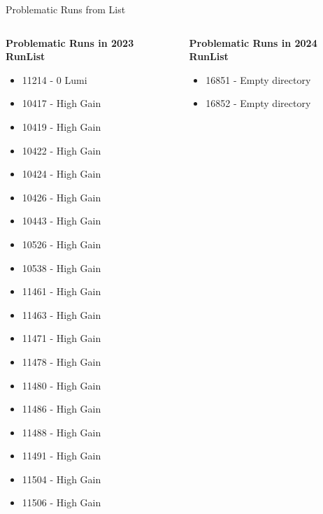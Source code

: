 \begin{frame}{Problematic Runs from List}
    \begin{columns}
        \begin{column}{0.5 \linewidth}
            \scriptsize \textbf{Problematic Runs in 2023 RunList}
            \begin{itemize}
                \setlength\itemsep{-0.1em}
                \scriptsize
                \item 11214 - 0 Lumi
                \item 10417 - High Gain
                \item 10419 - High Gain
                \item 10422 - High Gain
                \item 10424 - High Gain
                \item 10426 - High Gain
                \item 10443 - High Gain
                \item 10526 - High Gain
                \item 10538 - High Gain
                \item 11461 - High Gain
                \item 11463 - High Gain
                \item 11471 - High Gain
                \item 11478 - High Gain
                \item 11480 - High Gain
                \item 11486 - High Gain
                \item 11488 - High Gain
                \item 11491 - High Gain
                \item 11504 - High Gain
                \item 11506 - High Gain
            \end{itemize}
        \end{column}
        \begin{column}{0.5\linewidth}
            \scriptsize \textbf{Problematic Runs in 2024 RunList}
            \begin{itemize}
                \scriptsize
                \item 16851 - Empty directory
                \item 16852 - Empty directory
            \end{itemize}
        \end{column}
    \end{columns}
\end{frame}



